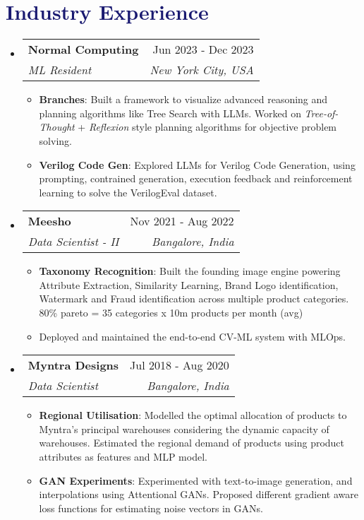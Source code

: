 \documentclass[letterpaper,10.7pt]{article}
\makeatletter
\newcommand{\resumeItem}[1]{
  \item\small{
    {#1 \vspace{-2pt}}
  }
}
\newcommand{\resumeSubheading}[4]{
  \vspace{-2pt}\item
    \begin{tabular*}{1.0\textwidth}[t]{l@{\extracolsep{\fill}}r}
      \textbf{#1} & \small #2 \\
      \textit{\small#3} & \textit{\small #4} \\
    \end{tabular*}\vspace{-7pt}
}
\newcommand{\resumeSubHeadingListStart}{\begin{itemize}[leftmargin=0.0in, label={}]}
\newcommand{\resumeSubHeadingListEnd}{\end{itemize}}
\newcommand{\resumeItemListStart}{\begin{itemize}}
\newcommand{\resumeItemListEnd}{\end{itemize}\vspace{-5pt}}
\makeatother
\begin{document}
\vspace{-0.2in}
\section{\textcolor{MidnightBlue}{Industry Experience}}
\resumeSubHeadingListStart

\resumeSubheading
{Normal Computing}{Jun 2023 - Dec 2023}
{ML Resident}{New York City, USA}
\resumeItemListStart
\resumeItem{\textbf{Branches}: Built a framework to visualize advanced reasoning and planning algorithms like Tree Search with LLMs. Worked on {\it Tree-of-Thought} + {\it Reflexion} style planning algorithms for objective problem solving.}

\resumeItem{\textbf{Verilog Code Gen}: Explored LLMs for Verilog Code Generation, using prompting, contrained generation, execution feedback and reinforcement learning to solve the VerilogEval dataset.}
\resumeItemListEnd

\vspace{0.3em}
\resumeSubheading
{Meesho}{Nov 2021 - Aug 2022}
{Data Scientist - II}{Bangalore, India}
\resumeItemListStart
\resumeItem{\textbf{Taxonomy Recognition}: Built the founding image engine powering Attribute Extraction, Similarity Learning, Brand Logo identification, Watermark and Fraud identification across multiple product categories. 80\% pareto = 35 categories x 10m products per month (avg)}
\resumeItem{Deployed and maintained the end-to-end CV-ML system with MLOps. \color{blue}{Project Impact: 30\% Reduction in cost = \$20M per year}}
\resumeItemListEnd

\vspace{0.3em}
\resumeSubheading
{Myntra Designs}{Jul 2018 - Aug 2020}{Data Scientist}{Bangalore, India}
\resumeItemListStart
\resumeItem{\textbf{Regional Utilisation}: Modelled the optimal allocation of products to Myntra's principal warehouses considering the dynamic capacity of warehouses. Estimated the regional demand of products using product attributes as features and MLP model. \color{blue}{\href{https://arxiv.org/abs/2007.05081}{\color{blue}{[arxiv]}} \\ \color{blue}{Project Impact: 27\% Improvement in RU; 20\% Improvement in 2DD}}}
\resumeItem{\textbf{GAN Experiments}: Experimented with text-to-image generation, and interpolations using Attentional GANs. Proposed different gradient aware loss functions for estimating noise vectors in GANs.}
\resumeItemListEnd
\resumeSubHeadingListEnd
\end{document}
